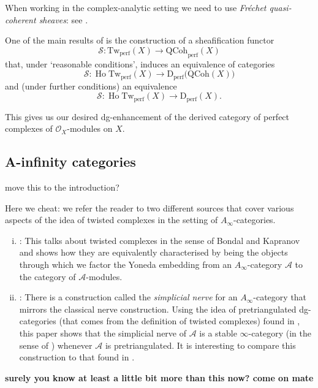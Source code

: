         \begin{note}
            When working in the complex-analytic setting we need to use \emph{Fréchet quasi-coherent sheaves}: see \cite[Remark~6.4]{Wei:2016ip}.
        \end{note}

        One of the main results of \cite{Wei:2016ip} is the construction of a sheafification functor
        \begin{equation*}
            \mathcal{S}\colon\mathrm{Tw}_\mathrm{perf}(X)\to\mathrm{QCoh}_\mathrm{perf}(X)
        \end{equation*}
        that, under `reasonable conditions', induces an equivalence of categories
        \begin{equation*}
            \mathcal{S}\colon\operatorname{Ho}\mathrm{Tw}_\mathrm{perf}(X)\to\mathrm{D}_\mathrm{perf}\big(\mathrm{QCoh}(X)\big)
        \end{equation*}
        and (under further conditions) an equivalence
        \begin{equation*}
            \mathcal{S}\colon\operatorname{Ho}\mathrm{Tw}_\mathrm{perf}(X)\to\mathrm{D}_\mathrm{perf}(X).
        \end{equation*}

        This gives us our desired dg-enhancement of the derived category of perfect complexes of $\mathcal{O}_X$-modules on $X$.

    \subsection{A-infinity categories}

        {\color{red}move this to the introduction?}

        Here we cheat: we refer the reader to two different sources that cover various aspects of the idea of twisted complexes in the setting of $A_\infty$-categories.
        \begin{enumerate}[(i)]
            \item \cite{Keller:2001tu}: This talks about twisted complexes in the sense of Bondal and Kapranov and shows how they are equivalently characterised by being the objects through which we factor the Yoneda embedding from an $A_\infty$-category $\mathcal{A}$ to the category of $\mathcal{A}$-modules.
            \item \cite{Faonte:2015vc}: There is a construction called the \emph{simplicial nerve} for an $A_\infty$-category that mirrors the classical nerve construction.
                Using the idea of pretriangulated dg-categories (that comes from the definition of twisted complexes) found in \cite{Bondal:1991un}, this paper shows that the simplicial nerve of $\mathcal{A}$ is a stable $\infty$-category (in the sense of \cite{Lurie:2016tv}) whenever $\mathcal{A}$ is pretriangulated.
                It is interesting to compare this construction to that found in \cite[1.3.1.6]{Lurie:2016tv}.
        \end{enumerate}

        {\color{red}\textbf{surely you know at least a little bit more than this now? come on mate}}
